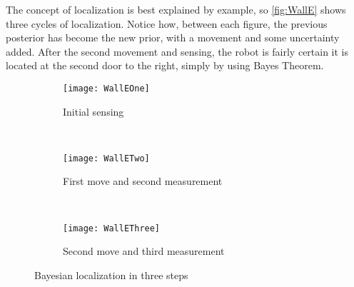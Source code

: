 \documentclass[Main]{subfiles}
\begin{document}
The concept of localization is best explained by example, so \autoref{fig:WallE} shows three cycles of localization. 
Notice how, between each figure, the previous posterior has become the new prior, with a movement and some uncertainty added. 
After the second movement and sensing, the robot is fairly certain it is located at the second door to the right, simply by using Bayes Theorem.\\
\begin{figure}[H]
	\centering
	\begin{subfigure}[b]{0.8\linewidth}
		\texttt{[image: WallEOne]}
		\caption{Initial sensing}
		\label{fig:WallEOne}
	\end{subfigure}\\
	\vspace{12pt} 
	\begin{subfigure}[b]{0.8\linewidth}
		\texttt{[image: WallETwo]}
		\caption{First move and second measurement}
		\label{fig:WallETwo}
	\end{subfigure}\\
	\vspace{12pt}
	\begin{subfigure}[b]{0.8\linewidth}
		\texttt{[image: WallEThree]}
		\caption{Second move and third measurement}
		\label{fig:WallEThree}
	\end{subfigure}
	\caption{Bayesian localization in three steps}
	\label{fig:WallE}
\end{figure}
\end{document}
